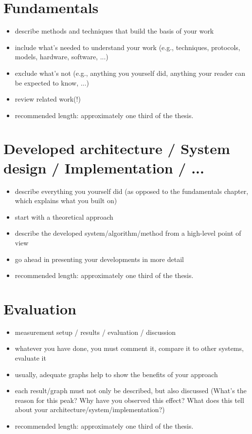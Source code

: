 \documentclass[]{ccs-thesis}
\begin{document}
\chapter{Fundamentals}
\label{sec:fundamentals}


\begin{itemize}
\item describe methods and techniques that build the basis of your work
\item include what's needed to understand your work (e.g., techniques, protocols, models, hardware, software, ...)
\item exclude what's not (e.g., anything you yourself did, anything your reader can be expected to know, ...)
\item review related work(!)
\item recommended length: approximately one third of the thesis.
\end{itemize}


\chapter{Developed architecture / System design / Implementation / ...}


\begin{itemize}
\item describe everything you yourself did (as opposed to the fundamentals chapter, which explains what you built on)
\item start with a theoretical approach
\item describe the developed system/algorithm/method from a high-level point of view
\item go ahead in presenting your developments in more detail
\item recommended length: approximately one third of the thesis.
\end{itemize}



\chapter{Evaluation}


\begin{itemize}
\item measurement setup / results / evaluation / discussion
\item whatever you have done, you must comment it, compare it to other systems, evaluate it
\item usually, adequate graphs help to show the benefits of your approach
\item each result/graph must not only be described, but also discussed (What's the reason for this peak? Why have you observed this effect? What does this tell about your architecture/system/implementation?)
\item recommended length: approximately one third of the thesis.
\end{itemize}
\end{document}
